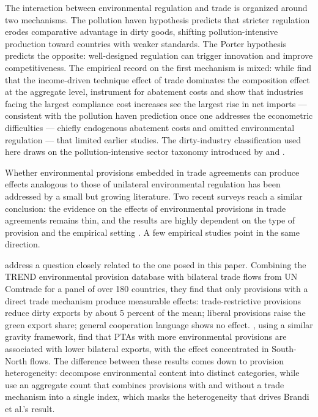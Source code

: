 \documentclass[12pt]{article}
\begin{document}
The interaction between environmental regulation and trade is organized around two mechanisms. The pollution haven hypothesis \citep{copelandtaylor1994} predicts that stricter regulation erodes comparative advantage in dirty goods, shifting pollution-intensive production toward countries with weaker standards. The Porter hypothesis \citep{porter1995} predicts the opposite: well-designed regulation can trigger innovation and improve competitiveness. The empirical record on the first mechanism is mixed: while \citet{antweiler2001} find that the income-driven technique effect of trade dominates the composition effect at the aggregate level, \citet{levinsontaylor2008} instrument for abatement costs and show that industries facing the largest compliance cost increases see the largest rise in net imports --- consistent with the pollution haven prediction once one addresses the econometric difficulties --- chiefly endogenous abatement costs and omitted environmental regulation --- that limited earlier studies. The dirty-industry classification used here draws on the pollution-intensive sector taxonomy introduced by \citet{mani1998} and \citet{low1992}.

Whether environmental provisions embedded in trade agreements can produce effects analogous to those of unilateral environmental regulation has been addressed by a small but growing literature. Two recent surveys reach a similar conclusion: the evidence on the effects of environmental provisions in trade agreements remains thin, and the results are highly dependent on the type of provision and the empirical setting \citep{gutsch2025, felbermayr2025}. A few empirical studies point in the same direction.

\citet{brandi2020} address a question closely related to the one posed in this paper. Combining the TREND environmental provision database \citep{morin2017} with bilateral trade flows from UN Comtrade for a panel of over 180 countries, they find that only provisions with a direct trade mechanism produce measurable effects: trade-restrictive provisions reduce dirty exports by about 5 percent of the mean; liberal provisions raise the green export share; general cooperation language shows no effect. \citet{berger2020}, using a similar gravity framework, find that PTAs with more environmental provisions are associated with lower bilateral exports, with the effect concentrated in South-North flows. The difference between these results comes down to provision heterogeneity: \citet{brandi2020} decompose environmental content into distinct categories, while \citet{berger2020} use an aggregate count that combines provisions with and without a trade mechanism into a single index, which masks the heterogeneity that drives Brandi et al.'s result.
\end{document}
